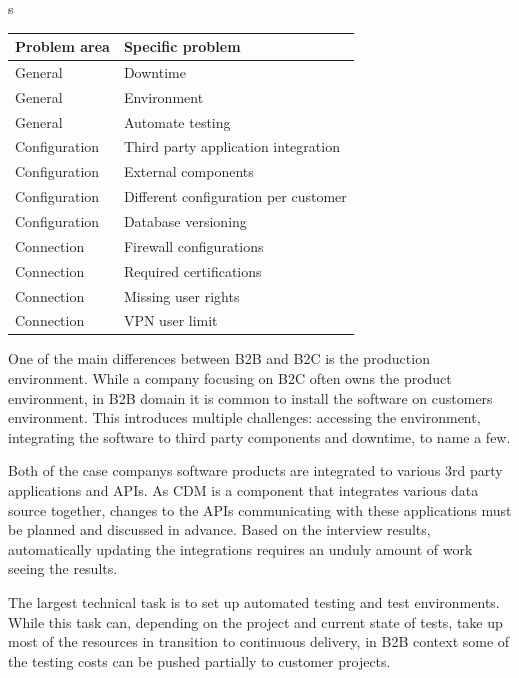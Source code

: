 \documentclass[english]{tktltiki2}
\theoremstyle{definition}
\theoremstyle{remark}
\begin{document}
\begin{center}s
    \begin{tabular}{ | l | p{5cm} |}
    \hline
    Problem area & Specific problem \\ \hline
    General & Downtime \\ \hline
    General & Environment \\ \hline
    General & Automate testing \\ \hline
    Configuration & Third party application integration \\ \hline
    Configuration & External components \\ \hline
    Configuration & Different configuration per customer \\ \hline
    Configuration & Database versioning \\ \hline
    Connection & Firewall configurations \\ \hline
    Connection & Required certifications \\ \hline
    Connection & Missing user rights \\ \hline
	Connection & VPN user limit \\ \hline
    \hline
    \end{tabular}
\end{center}

One of the main differences between B2B and B2C is the production environment. While a company focusing on B2C often owns the product environment, in B2B domain it is common to install the software on customers environment. This introduces multiple challenges: accessing the environment, integrating the software to third party components and downtime, to name a few. 

Both of the case companys software products are integrated to various 3rd party applications and APIs. As CDM is a component that integrates various data source together, changes to the APIs communicating with these applications must be planned and discussed in advance. Based on the interview results, automatically updating the integrations requires an unduly amount of work seeing the results. 

The largest technical task is to set up automated testing and test environments. While this task can, depending on the project and current state of tests, take up most of the resources in transition to continuous delivery, in B2B context some of the testing costs can be pushed partially to customer projects.  
\end{document}
